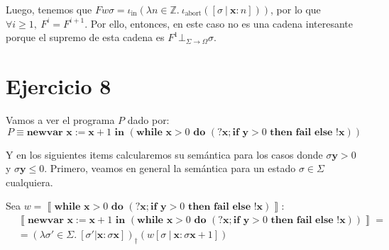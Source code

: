 \documentclass{article}
\newcommand{\sem}[1]{\left\llbracket #1\right\rrbracket}
\newcommand{\Z}{\mathbb{Z}}
\newcommand{\x}{\textbf{x}}
\newcommand{\y}{\textbf{y}}
\newcommand{\cdomfo}{\Sigma \to \Omega}
\newcommand{\cfbotfo}{\bot_{\cdomfo}}
\newcommand{\cif}[3]{\textbf{if }#1\textbf{ then }#2\textbf{ else }#3}
\newcommand{\cnewvar}[3]{\textbf{newvar }#1 := #2\textbf{ in }#3}
\newcommand{\cwhile}[2]{\textbf{while }#1\textbf{ do }#2}
\newcommand{\cfail}{\textbf{fail}}
\newcommand{\iabort}[1]{\iota_\text{abort}\left(#1\right)}
\newcommand{\iin}[2]{\iota_\text{in}\left(\lambda #1 \in \Z .\ #2\right)}
\begin{document}
Luego, tenemos que $Fw\sigma = \iin{n}{\iabort{[\sigma\ |\ \x : n]}}$, por lo que $\forall i \geq 1,\ F^{i} = F^{i+1}$.
Por ello, entonces, en este caso no es una cadena interesante porque el supremo de esta cadena es $F^1 \cfbotfo \sigma$.

\section*{Ejercicio 8}
Vamos a ver el programa $P$ dado por:
\begin{equation*}
  P \equiv \cnewvar{\x}{\x+1}{(\cwhile{\x>0}{(?\x;\cif{\y>0}{\cfail}{!\x})})}
\end{equation*}

Y en los siguientes items calcularemos su semántica para los casos donde $\sigma\y>0$ y $\sigma\y \leq 0$.
Primero, veamos en general la semántica para un estado $\sigma \in \Sigma$ cualquiera.

Sea $w = \sem{\cwhile{\x>0}{(?\x; \cif{\y>0}{\cfail}{!\x})}}$:
\begin{equation}
  \tag*{(8.1)}
  \begin{aligned}
    & \sem{\cnewvar{\x}{\x+1}{(\cwhile{\x>0}{(?\x; \cif{\y>0}{\cfail}{!\x})})}} = \\ 
    &= (\lambda \sigma' \in \Sigma .\ [\sigma' | \x : \sigma\x])_\dagger (w[\sigma\ |\ \x : \sigma\x+1])
  \end{aligned}
\end{equation}
\end{document}
